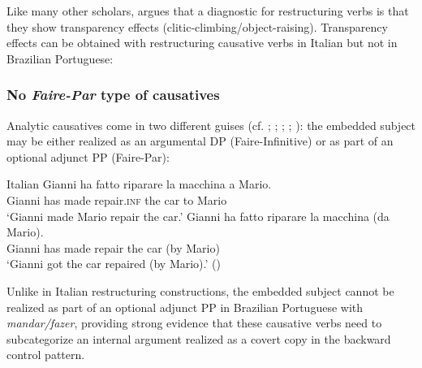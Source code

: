 \documentclass[output=paper]{langsci/langscibook}
\begin{document}
Like many other scholars, \citet{Cinque2004} argues that a diagnostic for restructuring verbs is that they show transparency effects (clitic-climbing/object-raising). Transparency effects can be obtained with restructuring causative verbs in Italian but not in Brazilian Portuguese:

\ea%
    \label{ex:moreno:17}
    \z
\z

\subsubsection{No \textit{Faire-Par} type of causatives} %

Analytic causatives come in two different guises (cf. \citealt{Kayne1975}; \citealt{Huber1980}; \citealt{Burzio1986}; \citealt{Enzinger2010}; \citealt{Campanini2012}): the embedded subject may be either realized as an argumental DP  (Faire-Infinitive) or as part of an optional adjunct PP (Faire-Par):

\ea%
         Italian\label{ex:moreno:18}
    \ea  
    \gll Gianni ha  fatto   riparare    la   macchina a Mario.\\
         Gianni has made repair.\textsc{inf} the car    to Mario \\
    \glt ‘Gianni made Mario repair the car.’
    \ex  
    \gll Gianni ha fatto    riparare   la  macchina   (da Mario). \\
         Gianni has made repair   the car  (by Mario) \\
    \glt ‘Gianni got the car repaired (by Mario).’ (\citealt{Campanini2012})
    \z
\z

Unlike in Italian restructuring constructions, the embedded subject cannot be realized as part of an optional adjunct PP in Brazilian Portuguese with \textit{mandar/fazer}, providing strong evidence that these causative verbs need to subcategorize an internal argument realized as a covert copy in the backward control pattern. 
\end{document}
